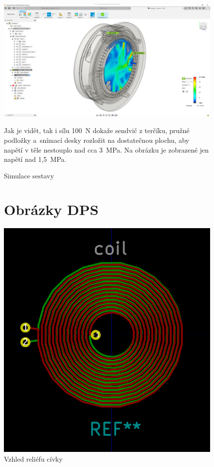 \begin{figure}
    \centering
    \includegraphics[width=\textwidth]{kapitoly/obrazky/E4/machanika_tlakove_desky/simulace/zjednodusena_sestava_pri_F100N_nezobrazeno_napeti_pod_1,5MPa.png}
    \caption{Simulace sestavy}
    Jak je vidět, tak i sílu 100~N dokaže sendvič z terčíku, pružné podložky a~snímací desky rozložit na dostatečnou plochu, aby napětí v těle nestouplo 
    nad cca 3~MPa. Na obrázku je zobrazené jen napětí nad 1,5~MPa.
    \label{fig:E4-simulace_tlakovky}
\end{figure}


\begin{figure}
\section{Obrázky DPS}
    \centering
    \includegraphics[width=\textwidth]{kapitoly/obrazky/E4/elektronika_tlakove_desky/civka.png}
    \caption{Vzhled reliéfu cívky}
    \label{fig:E4-relief_civka}
\end{figure}

